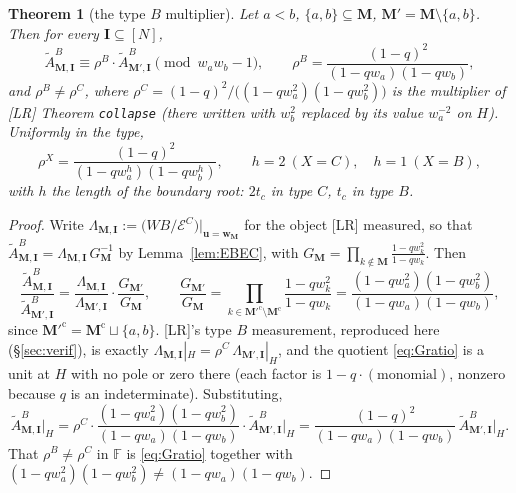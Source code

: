 \documentclass[11pt]{article}
\theoremstyle{plain}
\newtheorem{thm}{Theorem}
\theoremstyle{definition}
\theoremstyle{remark}
\theoremstyle{plain}
\newcommand{\bI}{\mathbf{I}}
\newcommand{\bM}{\mathbf{M}}
\newcommand{\bu}{\mathbf{u}}
\newcommand{\bw}{\mathbf{w}}
\newcommand{\At}{\widetilde{A}}
\begin{document}
\begin{thm}[the type $B$ multiplier]\label{thm:rhoB}
Let $a<b$, $\{a,b\}\subseteq\bM$, $\bM'=\bM\setminus\{a,b\}$.  Then for every
$\bI\subseteq[N]$,
\begin{equation}
\At^{B}_{\bM,\bI}\equiv\rho^B\cdot\At^{B}_{\bM',\bI}\pmod{w_aw_b-1},
\qquad
\rho^B=\frac{(1-q)^2}{(1-qw_a)(1-qw_b)},
\label{eq:rhoB}
\end{equation}
and $\rho^B\ne\rho^C$, where
$\rho^C=(1-q)^2/\bigl((1-qw_a^2)(1-qw_b^2)\bigr)$ is the multiplier of [LR]
Theorem \texttt{collapse} (there written with $w_b^2$ replaced by its value
$w_a^{-2}$ on $H$).  Uniformly in the type,
\begin{equation}
\rho^X=\frac{(1-q)^2}{(1-qw_a^{h})(1-qw_b^{h})},
\qquad h=2\ (X=C),\quad h=1\ (X=B),
\label{eq:rhoX}
\end{equation}
with $h$ the length of the boundary root: $2t_c$ in type $C$, $t_c$ in type $B$.
\end{thm}

\begin{proof}
Write $\Lambda_{\bM,\bI}:=\bigl(WB/\mathcal{E}^C\bigr)|_{\bu=\bw_{\bM}}$ for the
object [LR] measured, so that
$\At^{B}_{\bM,\bI}=\Lambda_{\bM,\bI}\,G_{\bM}^{-1}$ by
Lemma~\ref{lem:EBEC}, with
$G_{\bM}=\prod_{k\notin\bM}\frac{1-qw_k^2}{1-qw_k}$.  Then
\begin{equation}
\frac{\At^{B}_{\bM,\bI}}{\At^{B}_{\bM',\bI}}
=\frac{\Lambda_{\bM,\bI}}{\Lambda_{\bM',\bI}}\cdot\frac{G_{\bM'}}{G_{\bM}},
\qquad
\frac{G_{\bM'}}{G_{\bM}}
=\prod_{k\in\bM'^{\mathrm{c}}\setminus\bM^{\mathrm{c}}}\frac{1-qw_k^2}{1-qw_k}
=\frac{(1-qw_a^2)(1-qw_b^2)}{(1-qw_a)(1-qw_b)},
\label{eq:Gratio}
\end{equation}
since $\bM'^{\mathrm{c}}=\bM^{\mathrm{c}}\sqcup\{a,b\}$.  [LR]'s type $B$
measurement, reproduced here (\S\ref{sec:verif}), is exactly
$\Lambda_{\bM,\bI}|_H=\rho^C\,\Lambda_{\bM',\bI}|_H$, and the quotient
\eqref{eq:Gratio} is a unit at $H$ with no pole or zero there (each factor is
$1-q\cdot(\text{monomial})$, nonzero because $q$ is an indeterminate).
Substituting,
\[
\At^{B}_{\bM,\bI}\big|_H
=\rho^C\cdot\frac{(1-qw_a^2)(1-qw_b^2)}{(1-qw_a)(1-qw_b)}\cdot
 \At^{B}_{\bM',\bI}\big|_H
=\frac{(1-q)^2}{(1-qw_a)(1-qw_b)}\,\At^{B}_{\bM',\bI}\big|_H .
\]
That $\rho^B\neq\rho^C$ in $\mathbb{F}$ is \eqref{eq:Gratio} together with
$(1-qw_a^2)(1-qw_b^2)\neq(1-qw_a)(1-qw_b)$.
\end{proof}
\end{document}
